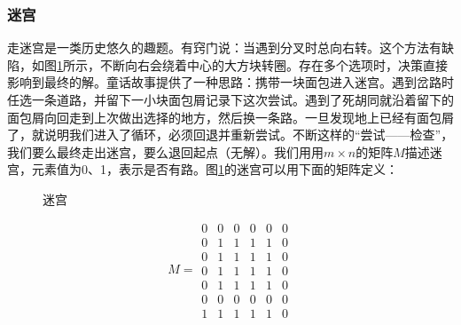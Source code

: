 \documentclass[b5paper]{ctexart}
\begin{document}
\subsubsection{迷宫}
走迷宫是一类历史悠久的趣题。有窍门说：当遇到分叉时总向右转。这个方法有缺陷，如图\ref{fig:maze-loop}所示，不断向右会绕着中心的大方块转圈。存在多个选项时，决策直接影响到最终的解。童话故事提供了一种思路：携带一块面包进入迷宫。遇到岔路时任选一条道路，并留下一小块面包屑记录下这次尝试。遇到了死胡同就沿着留下的面包屑向回走到上次做出选择的地方，然后换一条路。一旦发现地上已经有面包屑了，就说明我们进入了循环，必须回退并重新尝试。不断这样的“尝试——检查”，我们要么最终走出迷宫，要么退回起点（无解）。我们用用$m \times n$的矩阵$M$描述迷宫，元素值为0、1，表示是否有路。图\ref{fig:maze-loop}的迷宫可以用下面的矩阵定义：

\begin{figure}[htbp]
 \centering
 \caption{迷宫}
 \label{fig:maze-loop}
\end{figure}

\[
M = \begin{matrix}
0 & 0 & 0 & 0 & 0 & 0 \\
0 & 1 & 1 & 1 & 1 & 0 \\
0 & 1 & 1 & 1 & 1 & 0 \\
0 & 1 & 1 & 1 & 1 & 0 \\
0 & 1 & 1 & 1 & 1 & 0 \\
0 & 0 & 0 & 0 & 0 & 0 \\
1 & 1 & 1 & 1 & 1 & 0
\end{matrix}
\]
\end{document}
